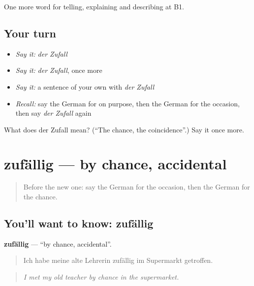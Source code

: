 \begin{grammarlens}[title={What you've built}]
One more word for telling, explaining and describing at B1.
\end{grammarlens}

\subsection*{Your turn}
\begin{itemize}
\raggedright
  \item \emph{Say it:} \emph{der Zufall}
  \item \emph{Say it:} \emph{der Zufall}, once more
  \item \emph{Say it:} a sentence of your own with \emph{der Zufall}
  \item \emph{Recall:} say the German for on purpose, then the German for the occasion, then say \emph{der Zufall} again
\end{itemize}

\begin{tcolorbox}[breakable,colback=teal!4,colframe=teal!35!black,title={Before you move on}]
What does der Zufall mean? (\textquotedblleft{}The chance, the coincidence\textquotedblright{}.) Say it once more.
\end{tcolorbox}
\section[zufällig]{zufällig — by chance, accidental}

\label{lesson:GE-C347-zufaellig}



\begin{quote}
Before the new one: say the German for the occasion, then the German for the chance.
\end{quote}

\subsection*{You'll want to know: zufällig}
\textbf{zufällig} — \textquotedblleft{}by chance, accidental\textquotedblright{}.

\begin{quote}
Ich habe meine alte Lehrerin zufällig im Supermarkt getroffen.
\end{quote}

\begin{quote}
\emph{I met my old teacher by chance in the supermarket.}
\end{quote}

